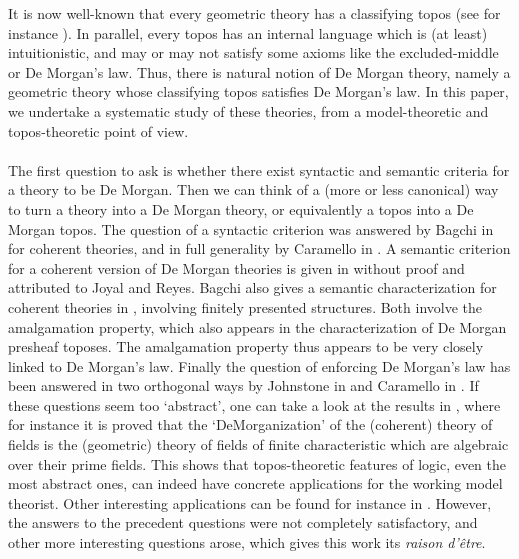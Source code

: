 \documentclass{article}
\begin{document}
It is now well-known that every geometric theory has a classifying topos (see for instance \cite{caramello2018theories}). In parallel, every topos has an internal language which is (at least) intuitionistic, and may or may not satisfy some axioms like the excluded-middle or De Morgan's law. Thus, there is natural notion of De Morgan theory, namely a geometric theory whose classifying topos satisfies De Morgan's law. In this paper, we undertake a systematic study of these theories, from a model-theoretic and topos-theoretic point of view.\\
\\
The first question to ask is whether there exist syntactic and semantic criteria for a theory to be De Morgan. Then we can think of a (more or less canonical) way to turn a theory into a De Morgan theory, or equivalently a topos into a De Morgan topos. The question of a syntactic criterion was answered by Bagchi in \cite{bagchi1992morgan} for coherent theories, and in full generality by Caramello in \cite{caramello2009morgan}. A semantic criterion for a coherent version of De Morgan theories is given in \cite{harun1996applications} without proof and attributed to Joyal and Reyes. Bagchi also gives a semantic characterization for coherent theories in \cite{bagchi1992morgan}, involving finitely presented structures. Both involve the amalgamation property, which also appears in the characterization of De Morgan presheaf toposes. The amalgamation property thus appears to be very closely linked to De Morgan's law. Finally the question of enforcing De Morgan's law has been answered in two orthogonal ways by Johnstone in \cite{johnstone1980gleason} and Caramello in \cite{caramello2009morgan}. If these questions seem too `abstract', one can take a look at the results in \cite{caramello2009morgan2}, where for instance it is proved that the `DeMorganization' of the (coherent) theory of fields is the
(geometric) theory of fields of finite characteristic which are algebraic over their prime fields. This shows that topos-theoretic features of logic, even the most abstract ones, can indeed have concrete applications for the working model theorist. Other interesting applications can be found for instance in \cite{harun1996applications}. However, the answers to the precedent questions were not completely satisfactory, and other more interesting questions arose, which gives this work its \emph{raison d'être}. \\
\\
\end{document}
